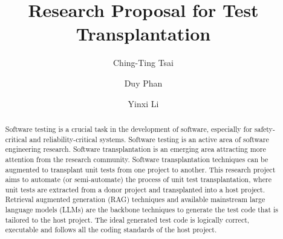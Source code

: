 \documentclass[sigconf]{acmart}
\begin{document}
\title{Research Proposal for Test Transplantation}

\author{Ching-Ting Tsai}

\author{Duy Phan}

\author{Yinxi Li}



\begin{abstract}
%
Software testing is a crucial task in the development of software, especially for safety-critical and reliability-critical systems.
%
Software testing is an active area of software engineering research.
%
Software transplantation is an emerging area attracting more attention from the research community.
%
Software transplantation techniques can be augmented to transplant unit tests from one project to another. 
%
This research project aims to automate (or semi-automate) the process of unit test transplantation, where unit tests are extracted from a donor project and transplanted into a host project.
%
Retrieval augmented generation (RAG) techniques and available mainstream large language models (LLMs) are the backbone techniques to generate the test code that is tailored to the host project.
%
The ideal generated test code is logically correct, executable and follows all the coding standards of the host project.
%
\end{abstract}
\end{document}
